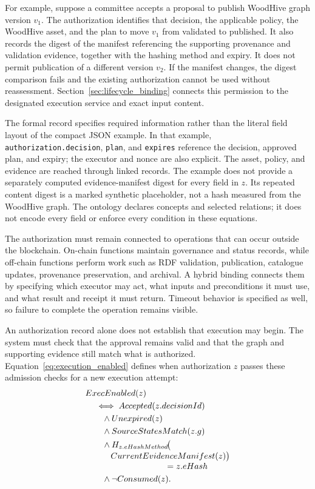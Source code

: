 \documentclass[journal]{IEEEtran}
\begin{document}
For example, suppose a committee accepts a proposal to publish
WoodHive graph version $v_1$. The authorization identifies that
decision, the applicable policy, the WoodHive asset, and the plan
to move $v_1$ from validated to published. It also records the
digest of the manifest referencing the supporting provenance and
validation evidence, together with the hashing method and expiry.
It does not permit publication of a different version $v_2$.
If the manifest changes, the digest comparison fails and the
existing authorization cannot be used without reassessment.
Section~\ref{sec:lifecycle_binding} connects this permission to
the designated execution service and exact input content.

The formal record specifies required information rather than the
literal field layout of the compact JSON example. In that example,
\texttt{authorization.decision}, \texttt{plan}, and \texttt{expires}
reference the decision, approved plan, and expiry; the executor and
nonce are also explicit. The asset, policy, and evidence are reached
through linked records. The example does not provide a separately
computed evidence-manifest digest for every field in $z$.
Its repeated content digest is a marked synthetic placeholder,
not a hash measured from the WoodHive graph. The ontology declares
concepts and selected relations; it does not encode every field
or enforce every condition in these equations.

The authorization must remain connected to operations that can occur
outside the blockchain. On-chain functions maintain governance and
status records, while off-chain functions perform work such as RDF
validation, publication, catalogue updates, provenance preservation,
and archival. A hybrid binding connects them by specifying which
executor may act, what inputs and preconditions it must use, and what
result and receipt it must return. Timeout behavior is specified as well,
so failure to complete the operation remains visible.

An authorization record alone does not establish that execution may
begin. The system must check that the approval remains valid and
that the graph and supporting evidence still match what is authorized.
Equation~\ref{eq:execution_enabled} defines when authorization $z$
passes these admission checks for a new execution attempt:
\begin{equation}
\label{eq:execution_enabled}
\begin{aligned}
&ExecEnabled(z)\\
&\quad\iff Accepted(z.decisionId)\\
&\qquad\land Unexpired(z)\\
&\qquad\land SourceStatesMatch(z.g)\\
&\qquad\land H_{z.eHashMethod}\!\bigl(\\[-1mm]
&\qquad\quad CurrentEvidenceManifest(z)\bigr)\\[-1mm]
&\hspace{33mm}{}=z.eHash\\
&\qquad\land\neg Consumed(z).
\end{aligned}
\end{equation}
\end{document}
